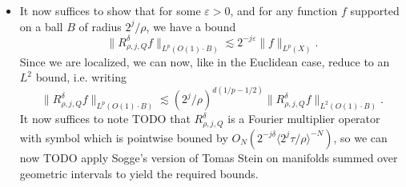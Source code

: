 \begin{itemize}

    
    

    \item It now suffices to show that for some $\varepsilon > 0$, and for any function $f$ supported on a ball $B$ of radius $2^j / \rho$, we have a bound
    \[ \| R^\delta_{\rho,j,Q} f \|_{L^p( O(1) \cdot B )} \lesssim 2^{-j \varepsilon} \| f \|_{L^p(X)}. \]
    Since we are localized, we can now, like in the Euclidean case, reduce to an $L^2$ bound, i.e. writing
    \[ \| R^\delta_{\rho,j,Q} f \|_{L^p( O(1) \cdot B)} \lesssim (2^j / \rho)^{d(1/p - 1/2)} \| R^\delta_{\rho,j,Q} f \|_{L^2(O(1) \cdot B)}. \]
    It now suffices to note TODO that $R^\delta_{\rho,j,Q}$ is a Fourier multiplier operator with symbol which is pointwise bouned by $O_N(2^{- j \delta}  \langle 2^j \tau / \rho \rangle^{-N})$, so we can now TODO apply Sogge's version of Tomas Stein on manifolds summed over geometric intervals to yield the required bounds.
\end{itemize}


%
%

